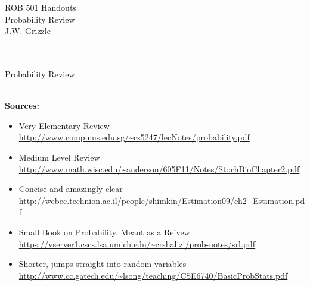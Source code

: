 \documentclass[12pt,letterpaper,headings=normal]{scrartcl}
\begin{document}


\baselineskip=48pt  %

%

\pagestyle{plain}

\vspace*{7cm}


\begin{center}
{\Large 
ROB 501 Handouts \\
Probability Review
\mbox{ } \\
J.W. Grizzle \\
\mbox{ } \\
\mbox{ }
}
\end{center}



\newpage
\vspace*{10cm}
{\Large 
\begin{center}
Probability Review \\
\mbox{ } \\
\end{center}
}
\newpage

\textbf{Sources:}
{\footnotesize
\begin{itemize}
\item Very Elementary Review  \url{http://www.comp.nus.edu.sg/~cs5247/lecNotes/probability.pdf}
\item  Medium Level Review \\ \url{http://www.math.wisc.edu/~anderson/605F11/Notes/StochBioChapter2.pdf}
\item  Concise and amazingly clear \\ \url{http://webee.technion.ac.il/people/shimkin/Estimation09/ch2_Estimation.pdf}
\item Small Book on Probability, Meant as a Reivew\\
\url{https://vserver1.cscs.lsa.umich.edu/~crshalizi/prob-notes/srl.pdf}
\item Shorter, jumps straight into random variables\\
\url{http://www.cc.gatech.edu/~lsong/teaching/CSE6740/BasicProbStats.pdf}
\end{itemize}
}
\end{document}
